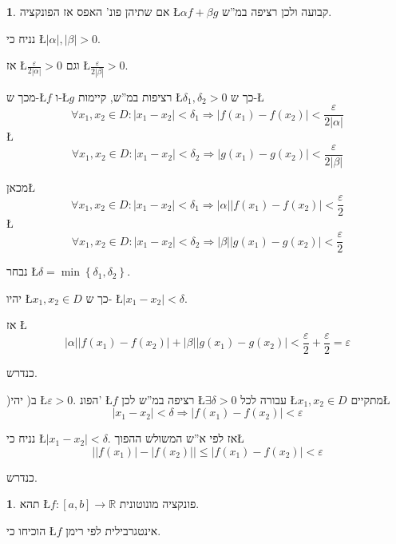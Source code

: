 \documentclass[english,hebrew]{article}
\theoremstyle{plain}
\theoremstyle{definition}
\newtheorem{xca}[thm]{\protect\exercisename}
\theoremstyle{definition}
\newtheorem*{sol*}{\protect\solutionname}
\providecommand{\exercisename}{תרגיל}
\providecommand{\solutionname}{פתרון}
\begin{document}
\begin{sol*}
אם שתיהן פונ' האפס אז הפונקציה \L{$\alpha f+\beta g$} קבועה ולכן
רציפה במ\textquotedblright ש.

נניח כי \L{$\left|\alpha\right|,\left|\beta\right|>0$}.

אז \L{$\frac{\varepsilon}{2\left|\alpha\right|}>0$} וגם \L{$\frac{\varepsilon}{2\left|\beta\right|}>0$}.

מכך ש-\L{$f$} ו-\L{$g$} רציפות במ\textquotedblright ש, קיימות \L{$\delta_{1},\delta_{2}>0$}
כך ש-\L{%
\[
\forall x_{1},x_{2}\in D:\left|x_{1}-x_{2}\right|<\delta_{1}\Rightarrow\left|f\left(x_{1}\right)-f\left(x_{2}\right)\right|<\frac{\varepsilon}{2\left|\alpha\right|}
\]
}%
\L{%
\[
\forall x_{1},x_{2}\in D:\left|x_{1}-x_{2}\right|<\delta_{2}\Rightarrow\left|g\left(x_{1}\right)-g\left(x_{2}\right)\right|<\frac{\varepsilon}{2\left|\beta\right|}
\]
}%

מכאן\L{%
\[
\forall x_{1},x_{2}\in D:\left|x_{1}-x_{2}\right|<\delta_{1}\Rightarrow\left|\alpha\right|\left|f\left(x_{1}\right)-f\left(x_{2}\right)\right|<\frac{\varepsilon}{2}
\]
}%
\L{%
\[
\forall x_{1},x_{2}\in D:\left|x_{1}-x_{2}\right|<\delta_{2}\Rightarrow\left|\beta\right|\left|g\left(x_{1}\right)-g\left(x_{2}\right)\right|<\frac{\varepsilon}{2}
\]
}%

נבחר \L{$\delta=\min\left\{ \delta_{1},\delta_{2}\right\} $}.

יהיו \L{$x_{1},x_{2}\in D$} כך ש- \L{$\left|x_{1}-x_{2}\right|<\delta$}.

אז \L{%
\[
\left|\alpha\right|\left|f\left(x_{1}\right)-f\left(x_{2}\right)\right|+\left|\beta\right|\left|g\left(x_{1}\right)-g\left(x_{2}\right)\right|<\frac{\varepsilon}{2}+\frac{\varepsilon}{2}=\varepsilon
\]
}%

כנדרש.

)ב( יהי \L{$\varepsilon>0$}. הפונ' \L{$f$} רציפה במ\textquotedblright ש
לכן \L{$\exists\delta>0$} עבורה לכל \L{$x_{1},x_{2}\in D$} מתקיים\L{%
\[
\left|x_{1}-x_{2}\right|<\delta\Rightarrow\left|f\left(x_{1}\right)-f\left(x_{2}\right)\right|<\varepsilon
\]
}%

נניח כי \L{$\left|x_{1}-x_{2}\right|<\delta$}. אז לפי א\textquotedblright ש
המשולש ההפוך\L{%
\[
\left|\left|f\left(x_{1}\right)\right|-\left|f\left(x_{2}\right)\right|\right|\le\left|f\left(x_{1}\right)-f\left(x_{2}\right)\right|<\varepsilon
\]
}%

כנדרש.
\end{sol*}
\begin{xca}
תהא \L{$f:\left[a,b\right]\rightarrow\mathbb{R}$} פונקציה מונוטונית. 

הוכיחו כי \L{$f$} אינטגרבילית לפי רימן.
\end{xca}
\end{document}
